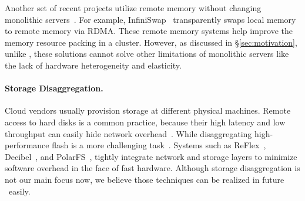 \documentclass[10pt,times,twocolumn]{z2-article}
\begin{document}
{{{{{{{Another set of recent projects utilize remote memory without changing 
monolithic servers~\cite{Dragojevic14-FaRM,Nelson15-ATC,remote-region-atc18,GU17-NSDI,Novakovic16-SOCC,hotpot-socc17}.
For example, InfiniSwap~\cite{GU17-NSDI} transparently swaps local memory to remote memory via RDMA.
These remote memory systems help improve the memory resource packing in a cluster.
However, as discussed in \S\ref{sec:motivation}, unlike \lego, these solutions cannot solve other limitations 
of monolithic servers like the lack of hardware heterogeneity and elasticity. 

\paragraph{Storage Disaggregation.}
Cloud vendors usually provision storage at different physical machines\cite{deepview-nsdi18,url:aws-storage,url:vmware-vSAN}.
Remote access to hard disks is a common practice, because their high latency and low throughput
can easily hide network overhead~\cite{petal-asplos96,blizzard-nsdi14,Parallax-hotos15,Legtchenko-hotstorage17}.
While disaggregating high-performance flash is a more challenging task~\cite{FlashDisaggregation,url:facebook-lighting}.
Systems such as ReFlex~\cite{ReFlex}, Decibel~\cite{decibel-nsdi17}, and PolarFS~\cite{PolarFS-VLDB18},
tightly integrate network and storage layers to minimize software overhead in the face of fast hardware.
Although storage disaggregation is not our main focus now,
we believe those techniques can be realized in future \lego\ easily.



}}}}}}}
\end{document}
